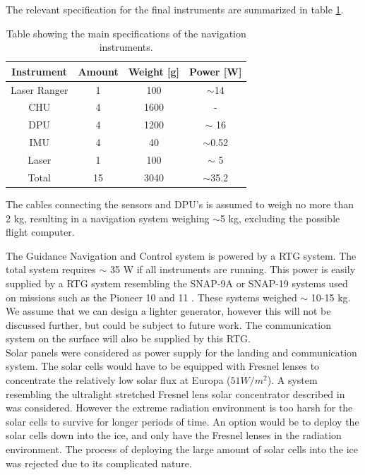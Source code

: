\noindent
The relevant specification for the final instruments are summarized in table \ref{tab:navinst}.

\begin{table}
\begin{center}
\begin{tabular}{|c|c|c|c|}
\hline
Instrument & Amount & Weight [g] & Power [W]\\
\hline
Laser Ranger & 1 & 100 & $\sim$14 \\
\hline
CHU & 4 & 1600 & - \\
\hline
DPU & 4 & 1200 &$\sim$ 16 \\
\hline
IMU & 4 & 40 & $\sim$0.52 \\
\hline
Laser & 1 & 100 & $\sim$ 5 \\
\hline
Total & 15 & 3040 & $\sim$35.2\\
\hline

\end{tabular}
\caption{Table showing the main specifications of the navigation instruments.}
\label{tab:navinst}
\end{center}
\end{table} 

\noindent
The cables connecting the sensors and DPU's is assumed to weigh no more than 2 kg, resulting in a navigation system weighing $\sim$5 kg, excluding the possible flight computer. 


The Guidance Navigation and Control system is powered by a RTG system. The total system requires $\sim$ 35 W if all instruments are running. This power is easily supplied by a RTG system resembling the SNAP-9A or SNAP-19 systems used on missions such as the Pioneer 10 and 11 \cite{wikirtg}. These systems weighed $\sim$ 10-15 kg. We assume that we can design a lighter generator, however this will not be discussed further, but could be subject to future work. The communication system on the surface will also be supplied by this RTG. \\

\noindent
Solar panels were considered as power supply for the landing and communication system. The solar cells would have to be equipped with Fresnel lenses to concentrate the relatively low solar flux at Europa ($51 W/m^2$). A system resembling the ultralight stretched Fresnel lens solar concentrator described in \cite{fresnel} was considered. However the extreme radiation environment is too harsh for the solar cells to survive for longer periods of time. An option would be to deploy the solar cells down into the ice, and only have the Fresnel lenses in the radiation environment. The process of deploying the large amount of solar cells into the ice was rejected due to its complicated nature. 
